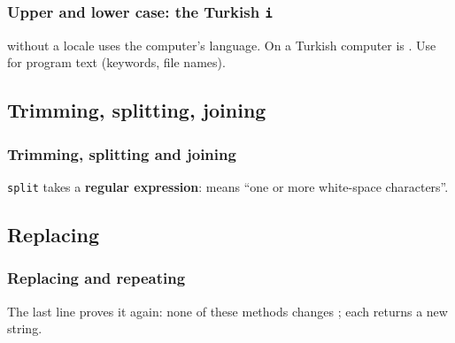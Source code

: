 \documentclass[aspectratio=169,10pt,compress]{beamer}
\begin{document}
\begin{frame}[t,fragile] \frametitle{Upper and lower case: the Turkish \texttt{i}}

  \vspace{0.3em}
  \small {} 
   without a locale uses the computer's language. 
  On a Turkish
  computer  is . 
  Use  for program text (keywords, file names).
\end{frame}




\subsection[Transform]{Trimming, splitting, joining}




\begin{frame}[t,fragile] \frametitle{Trimming, splitting and joining}

  \vspace{0.3em}
  \small \texttt{split} takes a \textbf{regular expression}: 
   means 
  ``one or more white-space characters''.
\end{frame}




\subsection[Replace]{Replacing}




\begin{frame}[t,fragile] \frametitle{Replacing and repeating}

  \vspace{0.3em}
  \small The last line proves it again: 
  none of these methods changes ; 
  each returns a new string.
\end{frame}
\end{document}

